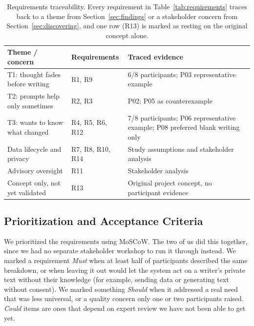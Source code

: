 \documentclass[sigconf,nonacm]{acmart}
\begin{document}
\begin{table}[tb]
  \centering
  \small
  \caption{Requirements traceability. Every requirement in
  Table~\ref{tab:requirements} traces back to a theme from
  Section~\ref{sec:findings} or a stakeholder concern from
  Section~\ref{sec:discovering}, and one row (R13) is marked as resting on
  the original concept alone.}
  \label{tab:reqtrace}
  \begin{tabularx}{\textwidth}{@{}X X X@{}}
    \toprule
    Theme / concern & Requirements & Traced evidence \\
    \midrule
    T1: thought fades before writing & R1, R9 & 6/8 participants; P03 representative example \\
    T2: prompts help only sometimes & R2, R3 & P02; P05 as counterexample \\
    T3: wants to know what changed & R4, R5, R6, R12 & 7/8 participants; P06 representative example; P08 preferred blank writing only \\
    Data lifecycle and privacy & R7, R8, R10, R14 & Study assumptions and stakeholder analysis \\
    Advisory oversight & R11 & Stakeholder analysis \\
    Concept only, not yet validated & R13 & Original project concept, no participant evidence \\
    \bottomrule
  \end{tabularx}
\end{table}

\subsection{Prioritization and Acceptance Criteria}

We prioritized the requirements using MoSCoW. The two of us did this
together, since we had no separate stakeholder workshop to run it through
instead. We marked a requirement \textit{Must} when at least half of
participants described the same breakdown, or when leaving it out would let
the system act on a writer's private text without their knowledge (for
example, sending data or generating text without consent). We marked
something \textit{Should} when it addressed a real need that was less
universal, or a quality concern only one or two participants raised.
\textit{Could} items are ones that depend on expert review we have not been
able to get yet.
\end{document}
